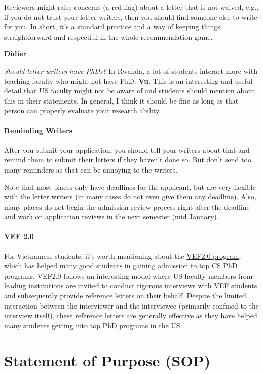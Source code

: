 \documentclass[oneside,11pt]{memoir}
\newenvironment{commentbox}[1][]{
  \small
  \begin{mybox}
    {\small \textbf{#1}}
  }{
  \end{mybox}
}
\begin{document}
Reviewers might raise concerns (a red flag) about  a letter that is not waived, e.g., if you do not trust your letter writers, then you should find someone else to write for you. In short, it's a standard practice and a way of keeping things straightforward and respectful in the whole recommendation game.

\begin{commentbox}[Didier]
  \emph{Should letter writers have PhDs?}  In Rwanda, a lot of students interact more with teaching faculty who might not have PhD.
  \tcblower
  \textbf{Vu}: This is an interesting and useful detail that US faculty might not be aware of and students should mention about this in their statements. In general, I think it should be fine as long as that person can properly evaluate your research ability.
\end{commentbox}

\paragraph{Reminding Writers} After you submit your application, you should tell your writers about that and remind them to submit their letters if they haven't done so. But don't send too many reminders as that can be annoying to the writers.

Note that most places only have deadlines for the applicant, but are very flexible with the letter writers (in many cases do not even give them any deadline).  Also, many places do not begin the admission review process right after the deadline and work on application reviews in the next semester (mid January).


\paragraph{VEF 2.0} For Vietnamese students, it's worth mentioning about the \href{https://vef2.org/}{VEF2.0 program}, which has helped many good students in gaining admission to top CS PhD programs. VEF2.0 follows an interesting model where US faculty members from leading institutions are invited to conduct rigorous interviews with VEF students and subsequently provide reference letters on their behalf. Despite the limited interaction between the interviewer and the interviewee (primarily confined to the interview itself), these reference letters are generally effective as they have helped many students getting into top PhD programs in the US.

\section{Statement of Purpose (SOP)}\label{sec:research-statement}
\end{document}
